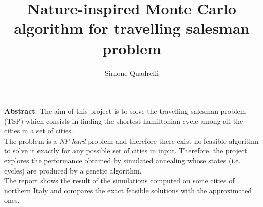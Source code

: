 \documentclass{article}
\begin{document}
\title{Nature-inspired Monte Carlo algorithm for travelling salesman problem}
\author{Simone Quadrelli}
\maketitle
\noindent \textbf{Abstract}. The aim of this project is to solve the travelling salesman problem (TSP) which consists in finding the shortest hamiltonian cycle among all the cities in a set of cities.\\
The problem is a \textit{NP-hard} problem and therefore there exist no feasible algorithm to solve it exactly for any possible set of cities in input. Therefore, the project explores the performance obtained by simulated annealing whose states (i.e. cycles) are produced by a genetic algorithm.\\
The report shows the result of the simulations computed on some cities of northern Italy and compares the exact feasible solutions with the approximated ones.
\end{document}

